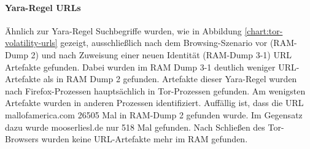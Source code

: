 \paragraph*{Yara-Regel \glqq{}URLs\grqq{}}
Ähnlich zur Yara-Regel \glqq{}Suchbegriffe\grqq{} wurden, wie in Abbildung \ref{chart:tor-volatility-urls} gezeigt, ausschließlich nach dem Browsing-Szenario vor (RAM-Dump 2) und nach Zuweisung einer neuen Identität (RAM-Dump 3-1) URL Artefakte gefunden. Dabei wurden im RAM Dump 3-1 deutlich weniger URL-Artefakte als in RAM Dump 2 gefunden. 
Artefakte dieser Yara-Regel wurden nach Firefox-Prozessen hauptsächlich in Tor-Prozessen gefunden. Am wenigsten Artefakte wurden in anderen Prozessen identifiziert.
Auffällig ist, dass die URL \glqq{}mallofamerica.com\grqq{} 26505 Mal in RAM-Dump 2 gefunden wurde. Im Gegensatz dazu wurde \glqq{}mooserliesl.de\grqq{} nur 518 Mal gefunden. Nach Schließen des Tor-Browsers wurden keine URL-Artefakte mehr im RAM gefunden.
